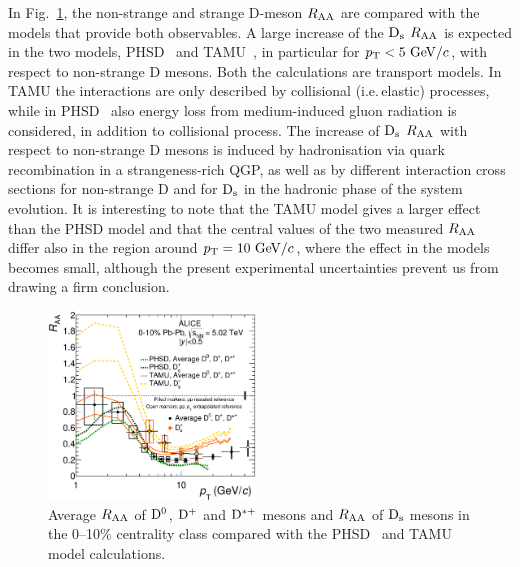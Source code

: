 In Fig.~\ref{fig:DandDsRaaWithModels},  the non-strange and 
strange D-meson $R_{\rm AA}$ are compared with  
the models that provide both observables. A large increase of
 the ${\rm D_s}$ $R_{\rm AA}$ is expected in the two models, PHSD~\cite{Song:2015ykw} and 
 TAMU~\cite{He:2014cla}, in particular for $p_{\rm T}<5~\mathrm{GeV}/c$, with respect to 
 non-strange D mesons. Both the calculations are transport models.  
In TAMU the interactions are only described by collisional (i.e.\,elastic) processes, 
while in PHSD~\cite{Song:2015ykw} also energy loss from medium-induced gluon radiation
is considered, in addition to collisional process.
The increase of ${\rm D_s}$ $R_{\rm AA}$ with respect to non-strange D mesons is induced by hadronisation 
 via quark recombination in a strangeness-rich QGP, as well as by different 
interaction cross sections for non-strange D and for ${\rm D_s}$ in 
the hadronic phase of the system evolution. It is interesting
 to note that the TAMU model gives a larger effect than the 
 PHSD model and that the central values of the two measured $R_{\rm AA}$ differ also 
in the region around $p_{\rm T}=10~\mathrm{GeV}/c$, where the effect in the 
models becomes small, although the present experimental 
uncertainties prevent us from drawing a firm conclusion. 


\begin{figure}[!t]
 \begin{center}
\includegraphics[angle=0, width=0.49\textwidth]{FigCap5/DmesonAverageDs_010_Models_logx_.eps}
 \end{center}
 \caption{Average $R_{\rm AA}$ of ${\rm D^0}$, ${\rm D^+}$ and ${\rm D^{*+}}$ mesons and $R_{\rm AA}$ of ${\rm D_s}$ mesons in the 0--10\% centrality class compared with the PHSD~\cite{Song:2015ykw}  and TAMU~\cite{He:2014cla} model calculations.}
 \label{fig:DandDsRaaWithModels} 
\end{figure} 


